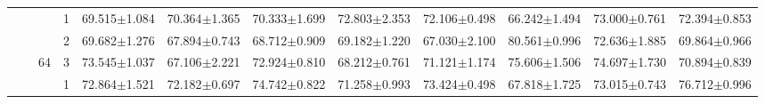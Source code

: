 \begin{table}[htpb]
{\begin{tabular}{c|c|c|c|rr|rr|rr|rr}
                                 &                                                                                 &                                                                                        & 1                                                                                         & 69.515$\pm$1.084                        & 70.364$\pm$1.365                        & 70.333$\pm$1.699                        & 72.803$\pm$2.353                        & 72.106$\pm$0.498                        & 66.242$\pm$1.494                        & 73.000$\pm$0.761                        & 72.394$\pm$0.853                       \\
                                 &                                                                                 &                                                                                        & 2                                                                                         & 69.682$\pm$1.276                        & 67.894$\pm$0.743                        & 68.712$\pm$0.909                        & 69.182$\pm$1.220                        & 67.030$\pm$2.100                        & 80.561$\pm$0.996                        & 72.636$\pm$1.885                        & 69.864$\pm$0.966                       \\
                                 &                                                                                 & \multirow{-3}{*}{64}                                                                   & 3                                                                                         & 73.545$\pm$1.037                        & 67.106$\pm$2.221                        & 72.924$\pm$0.810                        & 68.212$\pm$0.761                        & 71.121$\pm$1.174                        & 75.606$\pm$1.506                        & 74.697$\pm$1.730                        & 70.894$\pm$0.839                       \\ \cline{3-12} 
                                 &                                                                                 &                                                                                        & 1                                                                                         & 72.864$\pm$1.521                        & 72.182$\pm$0.697                        & 74.742$\pm$0.822                        & 71.258$\pm$0.993                        & 73.424$\pm$0.498                        & 67.818$\pm$1.725                        & 73.015$\pm$0.743                        & 76.712$\pm$0.996                       \\

\end{tabular}}
\end{table}
